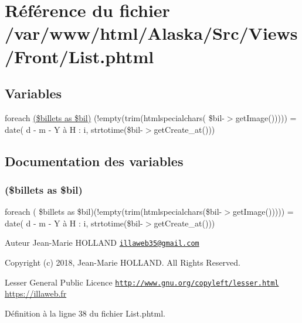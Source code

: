 \hypertarget{_front_2_list_8phtml}{}\section{Référence du fichier /var/www/html/\+Alaska/\+Src/\+Views/\+Front/\+List.phtml}
\label{_front_2_list_8phtml}
\subsection*{Variables}
\begin{DoxyCompactItemize}
\item 
foreach \hyperlink{_front_2_list_8phtml_ad2f3a7b0d156c4152b10073c2ddf4feb}{(\$billets as \$bil)} (!empty(trim(htmlspecialchars( \$bil-\/$>$get\+Image())))) = date(\textquotesingle{} d -\/ m -\/ Y à H \+: i\textquotesingle{}, strtotime(\$bil-\/$>$get\+Create\+\_\+at()))
\end{DoxyCompactItemize}


\subsection{Documentation des variables}
\mbox{\label{_front_2_list_8phtml_ad2f3a7b0d156c4152b10073c2ddf4feb}} 
\subsubsection{\texorpdfstring{(\$billets as \$bil)}{($billets as $bil)}}
{\footnotesize\ttfamily foreach ( \$billets as \$bil)(!empty(trim(htmlspecialchars(\$bil-\/$>$get\+Image())))) = date(\textquotesingle{} d -\/ m -\/ Y à H \+: i\textquotesingle{}, strtotime(\$bil-\/$>$get\+Create\+\_\+at()))}

\begin{DoxyAuthor}{Auteur}
Jean-\/\+Marie H\+O\+L\+L\+A\+ND \href{mailto:illaweb35@gmail.com}{\tt illaweb35@gmail.\+com} 
\end{DoxyAuthor}
\begin{DoxyCopyright}{Copyright}
(c) 2018, Jean-\/\+Marie H\+O\+L\+L\+A\+ND. All Rights Reserved.
\end{DoxyCopyright}
Lesser General Public Licence \href{http://www.gnu.org/copyleft/lesser.html}{\tt http\+://www.\+gnu.\+org/copyleft/lesser.\+html} \hyperlink{}{https\+://illaweb.\+fr}

Définition à la ligne 38 du fichier List.\+phtml.

